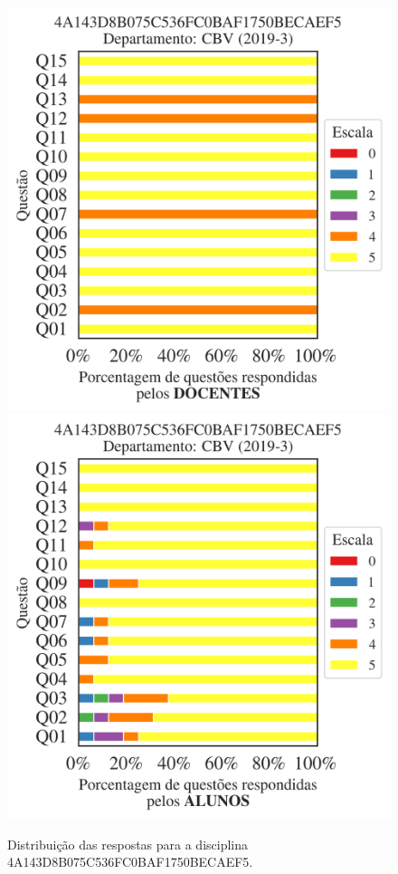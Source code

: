 \documentclass[a4paper,10pt]{article}
\begin{document}
\begin{figure}[h]
\centering
\includegraphics[width=0.485\linewidth]{analise_disciplina_departamento_CBV_4A143D8B075C536FC0BAF1750BECAEF5_docentes.png}
\includegraphics[width=0.485\linewidth]{analise_disciplina_departamento_CBV_4A143D8B075C536FC0BAF1750BECAEF5_alunos.png}
\caption{\label{fig:analise_geral_departamento}                Distribuição das respostas para a disciplina 4A143D8B075C536FC0BAF1750BECAEF5. }
\end{figure}
\end{document}
